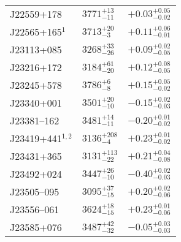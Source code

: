 \documentclass{aa}
\begin{document}
\begin{appendix}
\begin{center}
\begin{xtabular}{lll}
J22559+178 & $3771_{-11}^{+13}$ & $+0.03_{-0.02}^{+0.05}$ \\
J22565+165$^{1}$ & $3713_{-3}^{+20}$ & $+0.11_{-0.01}^{+0.06}$ \\
J23113+085 & $3268_{-26}^{+33}$ & $+0.09_{-0.05}^{+0.02}$ \\
J23216+172 & $3184_{-20}^{+61}$ & $+0.12_{-0.05}^{+0.08}$ \\
J23245+578 & $3786_{-8}^{+6}$ & $+0.15_{-0.02}^{+0.05}$ \\
J23340+001 & $3501_{-10}^{+20}$ & $-0.15_{-0.03}^{+0.02}$ \\
J23381--162 & $3481_{-11}^{+14}$ & $-0.20_{-0.02}^{+0.01}$ \\
J23419+441$^{1,2}$ & $3136_{-4}^{+208}$ & $+0.23_{-0.02}^{+0.01}$ \\
J23431+365 & $3131_{-22}^{+113}$ & $+0.21_{-0.08}^{+0.04}$ \\
J23492+024 & $3447_{-10}^{+26}$ & $-0.40_{-0.03}^{+0.02}$ \\
J23505--095 & $3095_{-15}^{+37}$ & $+0.20_{-0.06}^{+0.02}$ \\
J23556--061 & $3624_{-15}^{+18}$ & $+0.23_{-0.06}^{+0.01}$ \\
J23585+076 & $3487_{-32}^{+42}$ & $-0.05_{-0.03}^{+0.03}$ \\
\end{xtabular}
\end{center}

\end{appendix}
\end{document}
